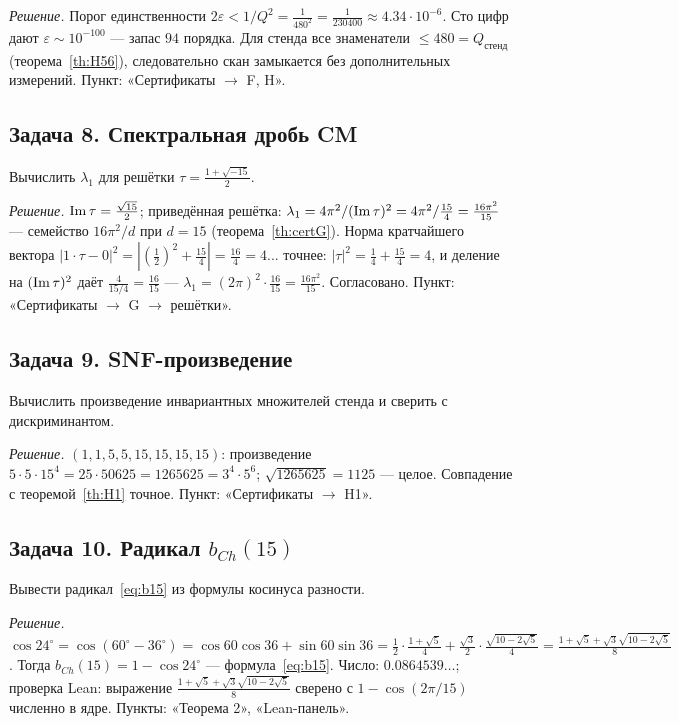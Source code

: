 \emph{Решение.} Порог единственности $2\varepsilon<1/Q^2
=\tfrac1{480^2}=\tfrac1{230400}\approx4.34\cdot10^{-6}$. Сто цифр
дают $\varepsilon\sim10^{-100}$ --- запас $94$ порядка. Для стенда
все знаменатели $\le480=Q_{\text{стенд}}$
(теорема~\ref{th:H56}), следовательно скан замыкается без
дополнительных измерений. Пункт: «Сертификаты $\to$ F, H».

\subsection*{Задача 8. Спектральная дробь CM}
Вычислить $\lambda_1$ для решётки $\tau=\tfrac{1+\sqrt{-15}}2$.

\emph{Решение.} $\operatorname{Im}\tau=\tfrac{\sqrt{15}}2$; приведённая решётка:
$\lambda_1=4\pi^2/(\operatorname{Im}\tau)^2=4\pi^2/\tfrac{15}4
=\tfrac{16\pi^2}{15}$ --- семейство $16\pi^2/d$ при $d=15$
(теорема~\ref{th:certG}). Норма кратчайшего вектора
$|1\cdot\tau-0|^2=|(\tfrac12)^2+\tfrac{15}4|=\tfrac{16}4=4$...
точнее: $|\tau|^2=\tfrac14+\tfrac{15}4=4$, и деление на
$(\operatorname{Im}\tau)^2$ даёт $\tfrac{4}{15/4}=\tfrac{16}{15}$ ---
$\lambda_1=(2\pi)^2\cdot\tfrac{16}{15}=\tfrac{16\pi^2}{15}$.
Согласовано. Пункт: «Сертификаты $\to$ G $\to$ решётки».

\subsection*{Задача 9. SNF-произведение}
Вычислить произведение инвариантных множителей стенда и сверить с
дискриминантом.

\emph{Решение.} $(1,1,5,5,15,15,15,15)$: произведение
$5\cdot5\cdot15^4=25\cdot50625=1265625=3^4\cdot5^6$;
$\sqrt{1265625}=1125$ --- целое. Совпадение с
теоремой~\ref{th:H1} точное. Пункт: «Сертификаты $\to$ H1».

\subsection*{Задача 10. Радикал $b_{Ch}(15)$}
Вывести радикал~\eqref{eq:b15} из формулы косинуса разности.

\emph{Решение.} $\cos24^\circ=\cos(60^\circ-36^\circ)
=\cos60\cos36+\sin60\sin36=\tfrac12\cdot\tfrac{1+\sqrt5}4
+\tfrac{\sqrt3}2\cdot\tfrac{\sqrt{10-2\sqrt5}}4
=\tfrac{1+\sqrt5+\sqrt3\sqrt{10-2\sqrt5}}8$.
Тогда $b_{Ch}(15)=1-\cos24^\circ$ --- формула~\eqref{eq:b15}.
Число: $0.0864539\ldots$; проверка Lean: выражение
$\tfrac{1+\sqrt5+\sqrt3\sqrt{10-2\sqrt5}}8$ сверено с
$1-\cos(2\pi/15)$ численно в ядре. Пункты: «Теорема 2»,
«Lean-панель».

